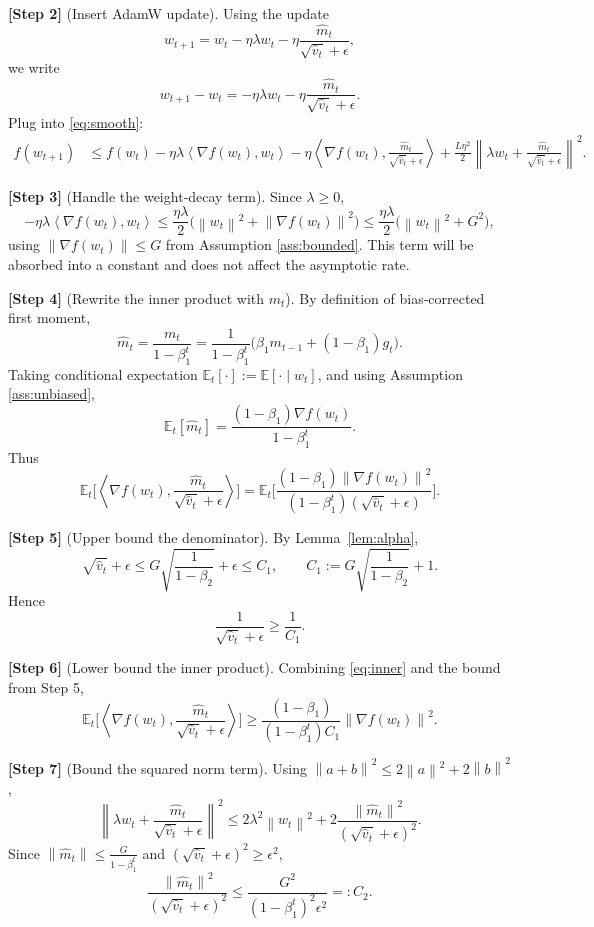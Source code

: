 \documentclass{article}
\newcommand{\E}{\mathbb{E}}
\newcommand{\norm}[1]{\left\lVert#1\right\rVert}
\newcommand{\ip}[2]{\left\langle #1,#2\right\rangle}
\begin{document}
\noindent\textbf{[Step 2]} (Insert AdamW update). Using the update
\[
w_{t+1}= w_t -\eta\lambda w_t - \eta\frac{\hat m_t}{\sqrt{\hat v_t}+\epsilon},
\]
we write
\[
w_{t+1}-w_t = -\eta\lambda w_t - \eta\frac{\hat m_t}{\sqrt{\hat v_t}+\epsilon}.
\]
Plug into \eqref{eq:smooth}:
\begin{align}
f(w_{t+1}) &\le f(w_t) -\eta\lambda\ip{\nabla f(w_t)}{w_t}
-\eta\ip{\nabla f(w_t)}{\frac{\hat m_t}{\sqrt{\hat v_t}+\epsilon}}
+\frac{L\eta^2}{2}\norm{\lambda w_t +\frac{\hat m_t}{\sqrt{\hat v_t}+\epsilon}}^2 .
\label{eq:raw}
\end{align}

\noindent\textbf{[Step 3]} (Handle the weight‑decay term). Since $\lambda\ge0$,
\[
-\eta\lambda\ip{\nabla f(w_t)}{w_t}
\le \frac{\eta\lambda}{2}\big(\norm{w_t}^2 + \norm{\nabla f(w_t)}^2\big)
\le \frac{\eta\lambda}{2}\big(\norm{w_t}^2 + G^2\big),
\]
using $\norm{\nabla f(w_t)}\le G$ from Assumption \ref{ass:bounded}. This term will be absorbed into a constant and does not affect the asymptotic rate.

\noindent\textbf{[Step 4]} (Rewrite the inner product with $m_t$). By definition of bias‑corrected first moment,
\[
\hat m_t = \frac{m_t}{1-\beta_1^{t}}
= \frac{1}{1-\beta_1^{t}} \Big(\beta_1 m_{t-1}+(1-\beta_1)g_t\Big).
\]
Taking conditional expectation $\E_t[\cdot]:=\E[\cdot\mid w_{t}]$, and using Assumption \ref{ass:unbiased},
\[
\E_t[\hat m_t]=\frac{(1-\beta_1) \nabla f(w_t)}{1-\beta_1^{t}}.
\]
Thus
\begin{equation}
\E_t\!\Big[\ip{\nabla f(w_t)}{\frac{\hat m_t}{\sqrt{\hat v_t}+\epsilon}}\Big]
= \E_t\!\Big[\frac{(1-\beta_1)\norm{\nabla f(w_t)}^2}
{(1-\beta_1^{t})(\sqrt{\hat v_t}+\epsilon)}\Big].
\label{eq:inner}
\end{equation}

\noindent\textbf{[Step 5]} (Upper bound the denominator). By Lemma~\ref{lem:alpha},
\[
\sqrt{\hat v_t}+\epsilon\le G\sqrt{\frac{1}{1-\beta_2}}+\epsilon
\le C_1,
\qquad C_1:=G\sqrt{\frac{1}{1-\beta_2}}+1.
\]
Hence
\[
\frac{1}{\sqrt{\hat v_t}+\epsilon}\ge \frac{1}{C_1}.
\]

\noindent\textbf{[Step 6]} (Lower bound the inner product). Combining \eqref{eq:inner} and the bound from Step 5,
\begin{equation}
\E_t\!\Big[\ip{\nabla f(w_t)}{\frac{\hat m_t}{\sqrt{\hat v_t}+\epsilon}}\Big]
\ge \frac{(1-\beta_1)}{(1-\beta_1^{t})C_1}
\norm{\nabla f(w_t)}^2 .
\label{eq:inner_lb}
\end{equation}

\noindent\textbf{[Step 7]} (Bound the squared norm term). Using $\norm{a+b}^2\le 2\norm{a}^2+2\norm{b}^2$,
\[
\norm{\lambda w_t +\frac{\hat m_t}{\sqrt{\hat v_t}+\epsilon}}^2
\le 2\lambda^2\norm{w_t}^2
+2\frac{\norm{\hat m_t}^2}{(\sqrt{\hat v_t}+\epsilon)^2}.
\]
Since $\norm{\hat m_t}\le \frac{G}{1-\beta_1^{t}}$ and $(\sqrt{\hat v_t}+\epsilon)^2\ge \epsilon^2$,
\[
\frac{\norm{\hat m_t}^2}{(\sqrt{\hat v_t}+\epsilon)^2}
\le \frac{G^2}{(1-\beta_1^{t})^2\epsilon^2}
=:C_2.
\]
\end{document}
